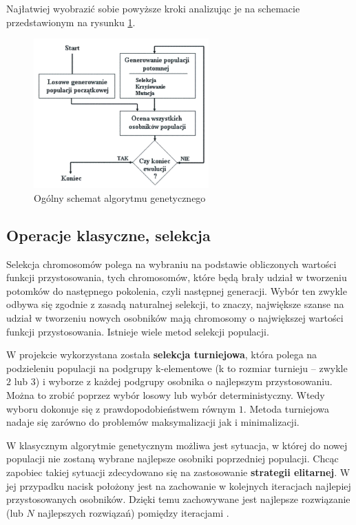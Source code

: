 \documentclass[twoside,12pt]{report}
\begin{document}
Najłatwiej wyobrazić sobie powyższe kroki analizując je na schemacie przedstawionym na rysunku \ref{fig:ogolny_schemat_alg_genetycznego}.

\begin{figure}[htbp]
	\centering
	\includegraphics[width=0.6\textwidth]{img/ogolgene}
	\caption{Ogólny schemat algorytmu genetycznego}
	\label{fig:ogolny_schemat_alg_genetycznego}
\end{figure}

\subsection{Operacje klasyczne, selekcja}
Selekcja chromosomów polega na wybraniu na podstawie obliczonych wartości funkcji przystosowania, tych chromosomów, które będą brały udział w tworzeniu potomków do następnego pokolenia, czyli następnej generacji. Wybór ten zwykle odbywa się zgodnie z zasadą naturalnej selekcji, to znaczy, największe szanse na udział w tworzeniu nowych osobników mają chromosomy o największej wartości funkcji przystosowania. Istnieje wiele metod selekcji populacji.

W projekcie wykorzystana została \textbf{selekcja turniejowa}, która polega na podzieleniu populacji na podgrupy k-elementowe (k to rozmiar turnieju – zwykle $2$ lub $3$) i wyborze z każdej podgrupy osobnika o najlepszym przystosowaniu. Można to zrobić poprzez wybór losowy lub wybór deterministyczny. Wtedy wyboru dokonuje się z prawdopodobieństwem równym $1$. Metoda turniejowa nadaje się zarówno do problemów maksymalizacji jak i minimalizacji.

W klasycznym algorytmie genetycznym możliwa jest sytuacja, w której do nowej populacji nie zostaną wybrane najlepsze osobniki poprzedniej populacji. Chcąc zapobiec takiej sytuacji zdecydowano się na zastosowanie \textbf{strategii elitarnej}. W jej przypadku nacisk położony jest na zachowanie w kolejnych iteracjach najlepiej przystosowanych osobników. Dzięki temu zachowywane jest najlepsze rozwiązanie (lub $N$ najlepszych rozwiązań) pomiędzy iteracjami \cite{genetyczne-teoria}. 
\end{document}

